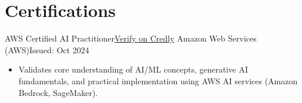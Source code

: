 \section*{Certifications}
\resumeSubHeadingListStart

\resumeSubheading
{AWS Certified AI Practitioner}{\href{https://www.credly.com/badges/27eb6ffe-8f43-4722-b97c-9c1ccf054ed4/public_url}{Verify on Credly}}
{Amazon Web Services (AWS)}{Issued: Oct 2024}

\begin{itemize}
    \item Validates core understanding of AI/ML concepts, generative AI fundamentals, and practical implementation using AWS AI services (Amazon Bedrock, SageMaker).
\end{itemize}

\resumeSubHeadingListEnd
